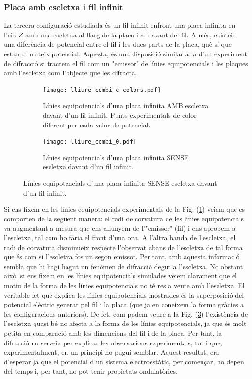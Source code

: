 \documentclass[11pt]{article}
\numberwithin{equation}{section}
\numberwithin{figure}{section}
\numberwithin{table}{section}
\begin{document}
\subsubsection{Placa amb escletxa i fil infinit}\label{sec:lliure}
La tercera configuració estudiada és un fil infinit enfront una placa infinita en l'eix $Z$ amb una escletxa al llarg de la placa i al davant del fil. A més, existeix una diferència de potencial entre el fil i les dues parts de la placa, què sí que estan al mateix potencial. Aquesta, és una disposició similar a la d'un experiment de difracció si tractem el fil com un "emissor" de línies equipotencials i les plaques amb l'escletxa com l'objecte que les difracta.

\begin{figure}[h]
    \centering
    \begin{subfigure}{0.495\textwidth}
        \centering
        \texttt{[image: lliure\_combi\_e\_colors.pdf]}
        \caption{Línies equipotencials d'una placa infinita AMB escletxa davant d'un fil infinit. Punts experimentals de color diferent per cada valor de potencial.}
        \label{fig: lliure_pot_e}
    \end{subfigure}
    \begin{subfigure}{0.495\textwidth} 
        \centering
        \texttt{[image: lliure\_combi\_0.pdf]}
        \caption{Línies equipotencials d'una placa infinita SENSE escletxa davant d'un fil infinit.}
        \label{fig: lliure_pot_0}
    \end{subfigure}
\end{figure}
Si ens fixem en les línies equipotencials experimentals de la Fig. (\ref{fig: lliure_pot_e}) veiem que es comporten de la següent manera: el radi de corvatura de les línies equipotencials va augmentant a mesura que ens allunyem de l'"emissor" (fil) i ens apropem a l'escletxa, tal com ho faria el front d'una ona. A l'altra banda de l'escletxa, el radi de corvatura disminueix respecte l'observat abans de l'escletxa de tal forma que és com si l'escletxa fos un segon emissor. Per tant, amb aquesta informació sembla que hi hagi hagut un fenòmen de difracció degut a l'escletxa.
No obstant això, si ens fixem en les línies equipotencials simulades veiem clarament que el motiu de la forma de les línies equipotencials no té res a veure amb l'escletxa. El veritable fet que explica les línies equipotencials mostrades és la superposició del potencial elèctric generat pel fil i la placa (que ja en coneixem la forma gràcies a les configuracions anteriors). De fet, com podem veure a la Fig. (\ref{fig: lliure_pot_0}) l'existència de l'escletxa quasi bé no afecta a la forma de les línies equipotencials, ja que és molt petita en comparació amb les dimencions del fil i de la placa. Per tant, la difracció no serveix per explicar les observacions experimentals, tot i que, experimentalment, en un principi ho pugui semblar. Aquest resultat, era d'esperar ja que el potencial d'un sistema electroestàtic, per començar, no depen del temps i, per tant, no pot tenir propietats ondulatòries.
\end{document}

